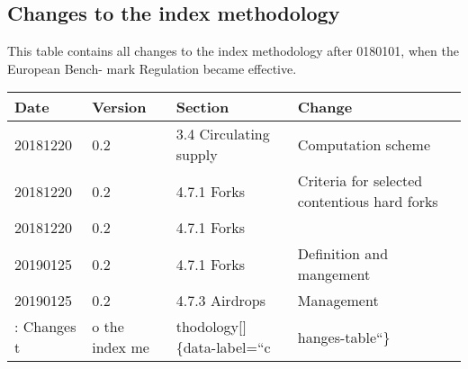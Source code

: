 \documentclass{article}
\begin{document}
\subsection{Changes to the index
methodology}\label{changes-to-the-index-methodology}

This table contains all changes to the index methodology after 0180101,
when the European Bench- mark Regulation became effective.

\begin{longtable}[]{@{}llll@{}}
\toprule
\textbf{Date} & \textbf{Version} & \textbf{Section} &
\textbf{Change}\tabularnewline
\midrule
\endhead
20181220 & 0.2 & 3.4 Circulating supply & Computation
scheme\tabularnewline
20181220 & 0.2 & 4.7.1 Forks & Criteria for selected contentious hard
forks\tabularnewline
20181220 & 0.2 & 4.7.1 Forks &\tabularnewline
20190125 & 0.2 & 4.7.1 Forks & Definition and mangement \tabularnewline
20190125 & 0.2 & 4.7.3 Airdrops & Management \tabularnewline
: Changes t & o the index me & thodology{[}{]}\{data-label=``c &
hanges-table``\}\tabularnewline
\bottomrule
\end{longtable}
\end{document}
